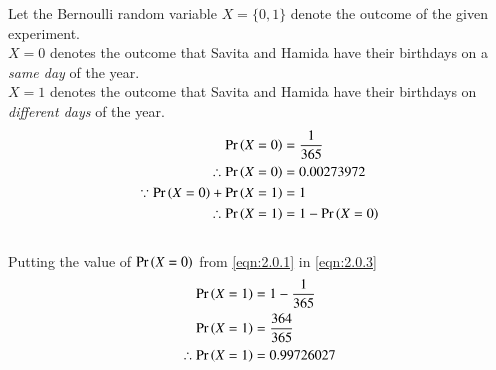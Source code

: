 Let the Bernoulli random variable $X = \{ 0,1 \}$ denote the outcome of the given experiment.\\
$X = 0$ denotes the outcome that Savita and Hamida have their birthdays on a \textit{same day} of the year.\\
$X = 1$ denotes the outcome that Savita and Hamida have their birthdays on \textit{different days} of the year.
\begin{align}
    \Pr\left(X = 0\right) &= \frac{1}{365} \label{eqn:2.0.1}\\
    \therefore \Pr\left(X = 0\right) &= 0.00273972\\
    \because \Pr\left(X = 0\right) + \Pr\left(X = 1\right) &= 1 \\
    \therefore \Pr\left(X = 1\right) &= 1 - \Pr\left(X = 0\right)\label{eqn:2.0.3}
\end{align}\\
Putting the value of $\Pr\left(X = 0\right)$ from \eqref{eqn:2.0.1} in \eqref{eqn:2.0.3}
\begin{align}
     \Pr\left(X=1\right) &= 1 - \frac{1}{365}\\
     \Pr\left(X = 1\right) &= \frac{364}{365}\\
    \therefore \Pr\left(X = 1\right) &= 0.99726027
\end{align}